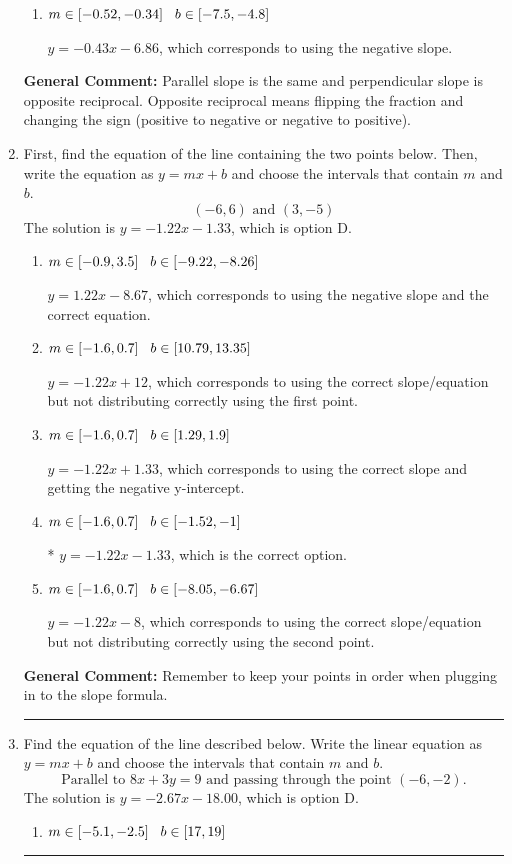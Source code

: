 \documentclass{extbook}[14pt]
\newcommand{\litem}[1]{\item #1

\rule{\textwidth}{0.4pt}}
\begin{document}
\begin{enumerate}
{\begin{enumerate}[label=\Alph*.]
 $y = 0.43x - 0.86$, which corresponds to using the correct slope and getting the negative $y$-intercept.
\item \( m \in [-0.52, -0.34] \hspace*{3mm} b \in [-7.5, -4.8] \)

 $y = -0.43x - 6.86$, which corresponds to using the negative slope.
\end{enumerate}

\textbf{General Comment:} Parallel slope is the same and perpendicular slope is opposite reciprocal. Opposite reciprocal means flipping the fraction and changing the sign (positive to negative or negative to positive).
}
\litem{
First, find the equation of the line containing the two points below. Then, write the equation as $ y=mx+b $ and choose the intervals that contain $m$ and $b$.
\[ (-6, 6) \text{ and } (3, -5) \]
The solution is \( y = -1.22x -1.33 \), which is option D.\begin{enumerate}[label=\Alph*.]
\item \( m \in [-0.9, 3.5] \hspace*{3mm} b \in [-9.22, -8.26] \)

 $y = 1.22x -8.67$, which corresponds to using the negative slope and the correct equation.
\item \( m \in [-1.6, 0.7] \hspace*{3mm} b \in [10.79, 13.35] \)

 $y = -1.22x + 12$, which corresponds to using the correct slope/equation but not distributing correctly using the first point.
\item \( m \in [-1.6, 0.7] \hspace*{3mm} b \in [1.29, 1.9] \)

 $y = -1.22x + 1.33$, which corresponds to using the correct slope and getting the negative y-intercept.
\item \( m \in [-1.6, 0.7] \hspace*{3mm} b \in [-1.52, -1] \)

* $y = -1.22x -1.33$, which is the correct option.
\item \( m \in [-1.6, 0.7] \hspace*{3mm} b \in [-8.05, -6.67] \)

 $y = -1.22x -8$, which corresponds to using the correct slope/equation but not distributing correctly using the second point.
\end{enumerate}

\textbf{General Comment:} Remember to keep your points in order when plugging in to the slope formula.
}
\litem{
Find the equation of the line described below. Write the linear equation as $ y=mx+b $ and choose the intervals that contain $m$ and $b$.
\[ \text{Parallel to } 8 x + 3 y = 9 \text{ and passing through the point } (-6, -2). \]
The solution is \( y = -2.67x - 18.00 \), which is option D.\begin{enumerate}[label=\Alph*.]
\item \( m \in [-5.1, -2.5] \hspace*{3mm} b \in [17, 19] \)


\end{enumerate}}
\end{enumerate}
\end{document}
